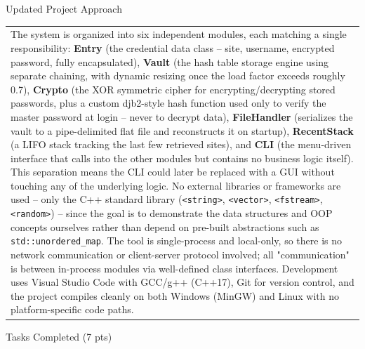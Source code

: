 \documentclass[12pt,a4paper]{article}
\newcommand{\sectiontitle}[1]{%
    {\color{GEUBlue}
    \fontsize{18}{22}\selectfont #1}
}
\newcommand{\answerbox}[2][]{%
    \begin{tabularx}{\textwidth}{
        |>{\raggedright\arraybackslash}X|}
        \hline
        \parbox[t]{\dimexpr\linewidth-12pt\relax}{
            \vspace{5pt}
            \fontsize{11}{13}\selectfont #2
            \vspace{5pt}
        }\\
        \hline
    \end{tabularx}
}
\begin{document}
\vspace{0.70cm}


\vspace{0.05cm}

\sectiontitle{Updated Project Approach}
\vspace{0.25cm}

\answerbox{The system is organized into six independent modules, each matching a single responsibility: \textbf{Entry} (the credential data class -- site, username, encrypted password, fully encapsulated), \textbf{Vault} (the hash table storage engine using separate chaining, with dynamic resizing once the load factor exceeds roughly 0.7), \textbf{Crypto} (the XOR symmetric cipher for encrypting/decrypting stored passwords, plus a custom djb2-style hash function used only to verify the master password at login -- never to decrypt data), \textbf{FileHandler} (serializes the vault to a pipe-delimited flat file and reconstructs it on startup), \textbf{RecentStack} (a LIFO stack tracking the last few retrieved sites), and \textbf{CLI} (the menu-driven interface that calls into the other modules but contains no business logic itself). This separation means the CLI could later be replaced with a GUI without touching any of the underlying logic. No external libraries or frameworks are used -- only the C++ standard library (\texttt{<string>}, \texttt{<vector>}, \texttt{<fstream>}, \texttt{<random>}) -- since the goal is to demonstrate the data structures and OOP concepts ourselves rather than depend on pre-built abstractions such as \texttt{std::unordered\_map}. The tool is single-process and local-only, so there is no network communication or client-server protocol involved; all "communication" is between in-process modules via well-defined class interfaces. Development uses Visual Studio Code with GCC/g++ (C++17), Git for version control, and the project compiles cleanly on both Windows (MinGW) and Linux with no platform-specific code paths.}

\newpage


\vspace*{0.20cm}

\sectiontitle{Tasks Completed (7 pts)}

\vspace{0.05cm}
\end{document}
